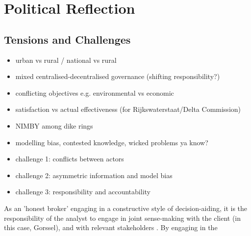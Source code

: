 \section{Political Reflection}
\label{s:poli_reflect}

\subsection{Tensions and Challenges}
\begin{itemize}
    \item urban vs rural / national vs rural
    \item mixed centralised-decentralised governance (shifting responsibility?)
    \item conflicting objectives e.g. environmental vs economic
    \item satisfaction vs actual effectiveness (for Rijkswaterstaat/Delta Commission)
    \item NIMBY among dike rings
    \item modelling bias, contested knowledge, wicked problems ya know?
    
    \item challenge 1: conflicts between actors
    \item challenge 2: asymmetric information and model bias
    \item challenge 3: responsibility and accountability
\end{itemize}


As an 'honest broker' engaging in a constructive style of decision-aiding, it is the responsibility of the analyst to engage in joint sense-making with the client (in this case, Gorssel), and with relevant stakeholders . By engaging in the 

